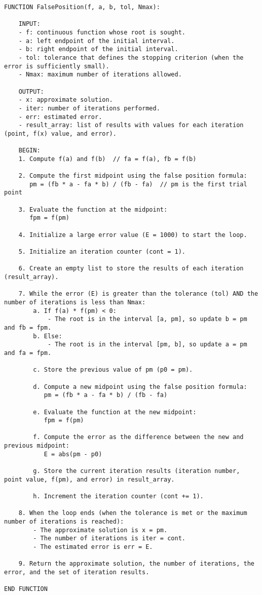 \documentclass{article}
\begin{document}
\begin{lstlisting}
FUNCTION FalsePosition(f, a, b, tol, Nmax):

    INPUT:
    - f: continuous function whose root is sought.
    - a: left endpoint of the initial interval.
    - b: right endpoint of the initial interval.
    - tol: tolerance that defines the stopping criterion (when the error is sufficiently small).
    - Nmax: maximum number of iterations allowed.

    OUTPUT:
    - x: approximate solution.
    - iter: number of iterations performed.
    - err: estimated error.
    - result_array: list of results with values for each iteration (point, f(x) value, and error).

    BEGIN:
    1. Compute f(a) and f(b)  // fa = f(a), fb = f(b)

    2. Compute the first midpoint using the false position formula:
       pm = (fb * a - fa * b) / (fb - fa)  // pm is the first trial point

    3. Evaluate the function at the midpoint:
       fpm = f(pm)

    4. Initialize a large error value (E = 1000) to start the loop.

    5. Initialize an iteration counter (cont = 1).

    6. Create an empty list to store the results of each iteration (result_array).

    7. While the error (E) is greater than the tolerance (tol) AND the number of iterations is less than Nmax:
        a. If f(a) * f(pm) < 0:
            - The root is in the interval [a, pm], so update b = pm and fb = fpm.
        b. Else:
            - The root is in the interval [pm, b], so update a = pm and fa = fpm.

        c. Store the previous value of pm (p0 = pm).

        d. Compute a new midpoint using the false position formula:
           pm = (fb * a - fa * b) / (fb - fa)

        e. Evaluate the function at the new midpoint:
           fpm = f(pm)

        f. Compute the error as the difference between the new and previous midpoint:
           E = abs(pm - p0)

        g. Store the current iteration results (iteration number, point value, f(pm), and error) in result_array.

        h. Increment the iteration counter (cont += 1).

    8. When the loop ends (when the tolerance is met or the maximum number of iterations is reached):
        - The approximate solution is x = pm.
        - The number of iterations is iter = cont.
        - The estimated error is err = E.

    9. Return the approximate solution, the number of iterations, the error, and the set of iteration results.

END FUNCTION
\end{lstlisting}
\end{document}
